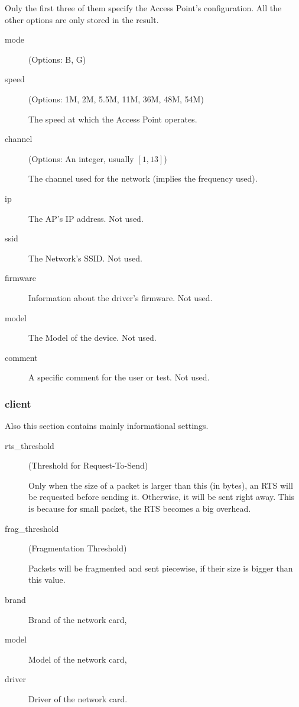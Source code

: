Only the first three of them specify the Access Point's configuration.
All the other options are only stored in the result.
\begin{description}
	\item[mode] (Options: B, G)
	\item[speed] (Options: 1M, 2M, 5.5M, 11M, 36M, 48M, 54M)

		The speed at which the Access Point operates.

	\item[channel] (Options: An integer, usually $[1,13]$)

		The channel used for the network (implies the frequency used).

	\item[ip]	The AP's IP address.  Not used.
	\item[ssid]	The Network's SSID.  Not used.
	\item[firmware]	Information about the driver's firmware.  Not used.
	\item[model]	The Model of the device.  Not used.
	\item[comment]	A specific comment for the user or test.  Not used.
\end{description}
%

\subsubsection{client}

\noindent
Also this section contains mainly informational settings.

\begin{description}
	\item[rts\_threshold] (Threshold for Request-To-Send) %

		Only when the size of a packet is larger than this (in bytes), an RTS will be requested before sending it.
		Otherwise, it will be sent right away.
		This is because for small packet, the RTS becomes a big overhead.

	\item[frag\_threshold] (Fragmentation Threshold) %
		
		Packets will be fragmented and sent piecewise, if their size is bigger than this value.

	\item[brand]	Brand of the network card,
	\item[model]	Model of the network card,
	\item[driver]	Driver of the network card.
\end{description}
%

